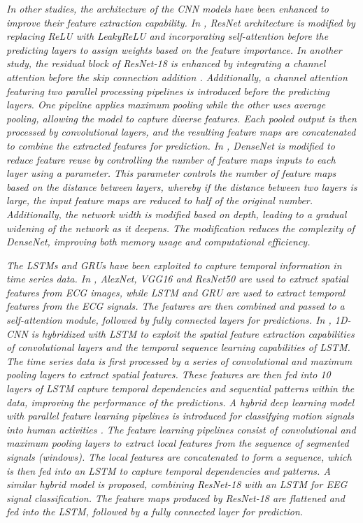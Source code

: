 \documentclass[preprint,12pt]{elsarticle}
\begin{document}
\emph{In other studies, the architecture of the CNN models have been enhanced to improve their feature extraction capability. In \citep{sun_self-attentional_2023}, ResNet architecture is modified by replacing ReLU with LeakyReLU and incorporating self-attention before the predicting layers to assign weights based on the feature importance. In another study, the residual block of ResNet-18 is enhanced by integrating a channel attention before the skip connection addition \citep{dong_improved_2023}. Additionally, a channel attention featuring two parallel processing pipelines is introduced before the predicting layers. One pipeline applies maximum pooling while the other uses average pooling, allowing the model to capture diverse features. Each pooled output is then processed by convolutional layers, and the resulting feature maps are concatenated to combine the extracted features for prediction. In \citep{hou_application_2024}, DenseNet is modified to reduce feature reuse by controlling the number of feature maps inputs to each layer using a parameter. This parameter controls the number of feature maps based on the distance between layers, whereby if the distance between two layers is large, the input feature maps are reduced to half of the original number. Additionally, the network width is modified based on depth, leading to a gradual widening of the network as it deepens. The modification reduces the complexity of DenseNet, improving both memory usage and computational efficiency.}

\emph{The LSTMs and GRUs have been exploited to capture temporal information in time series data. In \citep{narotamo_deep_2024}, AlexNet, VGG16 and ResNet50 are used to extract spatial features from ECG images, while LSTM and GRU are used to extract temporal features from the ECG signals. The features are then combined and passed to a self-attention module, followed by fully connected layers for predictions. In \citep{zhang_heart_2024}, 1D-CNN is hybridized with LSTM to exploit the spatial feature extraction capabilities of convolutional layers and the temporal sequence learning capabilities of LSTM. The time series data is first processed by a series of convolutional and maximum pooling layers to extract spatial features. These features are then fed into 10 layers of LSTM capture temporal dependencies and sequential patterns within the data, improving the performance of the predictions. A hybrid deep learning model with parallel feature learning pipelines is introduced for classifying motion signals into human activities \citep{mohd_noor_deep_2022}. The feature learning pipelines consist of convolutional and maximum pooling layers to extract local features from the sequence of segmented signals (windows). The local features are concatenated to form a sequence, which is then fed into an LSTM to capture temporal dependencies and patterns. A similar hybrid model is proposed, combining ResNet-18 with an LSTM for EEG signal classification. The feature maps produced by ResNet-18 are flattened and fed into the LSTM, followed by a fully connected layer for prediction.}
\end{document}
